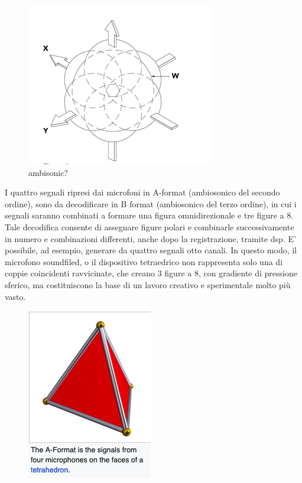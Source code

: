 \begin{figure}[t]
\begin{center}
\includegraphics[width=.47\textwidth]{img/img10.png}
\caption{ambisonic?} 
\label{gr01}
\end{center}
\end{figure}

I quattro segnali ripresi dai microfoni in A-format (ambiosonico del secondo ordine), 
sono da decodificare in B format (ambiosonico del terzo ordine), in cui i segnali 
saranno combinati a formare una figura omnidirezionale e tre figure a 8.
Tale decodifica consente di assegnare figure polari e combinarle successivamente 
in numero e combinazioni differenti, anche dopo la registrazione, tramite dsp. 
E' possibile, ad esempio, generare da quattro segnali otto canali.
In questo modo, il microfono soundfiled, o il dispositivo tetraedrico non rappresenta
solo una di coppie coincidenti ravvicinate, che creano 3 figure a 8, con gradiente
di pressione sferico, ma costituiscono la base di un lavoro creativo e sperimentale
molto più vasto.

\begin{figure}[t]
\begin{center}
\includegraphics[width=.47\textwidth]{img/img9.png}
\label{gr01}
\end{center}
\end{figure}


